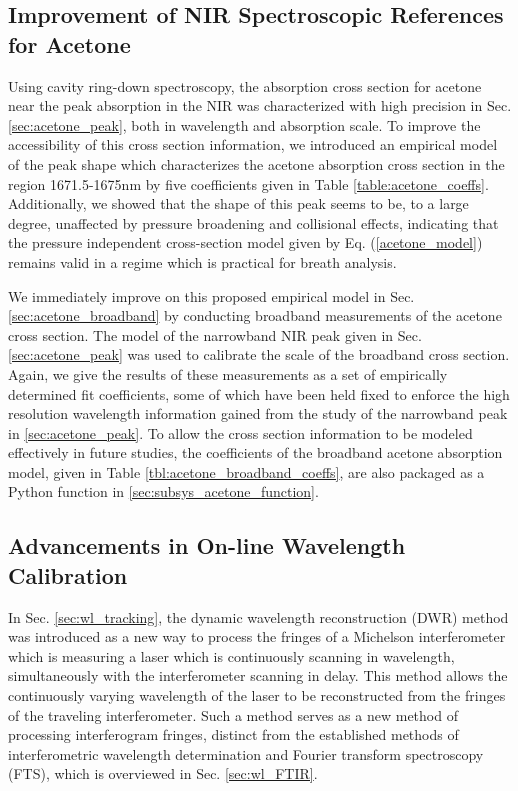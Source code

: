 \documentclass[8pt,a4paper]{report}
\begin{document}
	\subsection{Improvement of NIR Spectroscopic References for Acetone}
	Using cavity ring-down spectroscopy, the absorption cross section for acetone near the peak absorption in the NIR was characterized with high precision in Sec. \ref{sec:acetone_peak}, both in wavelength and absorption scale. To improve the accessibility of this cross section information, we introduced an empirical model of the peak shape which characterizes the acetone absorption cross section in the region 1671.5-1675nm by five coefficients given in Table \ref{table:acetone_coeffs}. Additionally, we showed that the shape of this peak seems to be, to a large degree, unaffected by pressure broadening and collisional effects, indicating that the pressure independent cross-section model given by Eq. (\ref{acetone_model}) remains valid in a regime which is practical for breath analysis.
	
	We immediately improve on this proposed empirical model in Sec. \ref{sec:acetone_broadband} by conducting broadband measurements of the acetone cross section. The model of the narrowband NIR peak given in Sec. \ref{sec:acetone_peak} was used to calibrate the scale of the broadband cross section. Again, we give the results of these measurements as a set of empirically determined fit coefficients, some of which have been held fixed to enforce the high resolution wavelength information gained from the study of the narrowband peak in \ref{sec:acetone_peak}. To allow the cross section information to be modeled effectively in future studies, the coefficients of the broadband acetone absorption model, given in Table \ref{tbl:acetone_broadband_coeffs}, are also packaged as a Python function in \ref{sec:subsys_acetone_function}.
	
	\subsection{Advancements in On-line Wavelength Calibration}
	In Sec. \ref{sec:wl_tracking}, the dynamic wavelength reconstruction (DWR) method was introduced as a new way to process the fringes of a Michelson interferometer which is measuring a laser which is continuously scanning in wavelength, simultaneously with the interferometer scanning in delay. This method allows the continuously varying wavelength of the laser to be reconstructed from the fringes of the traveling interferometer. Such a method serves as a new method of processing interferogram fringes, distinct from the established methods of interferometric wavelength determination and Fourier transform spectroscopy (FTS), which is overviewed in Sec. \ref{sec:wl_FTIR}.
	
\end{document}
